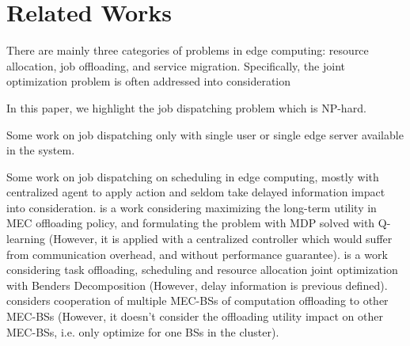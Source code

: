 \section{Related Works}
There are mainly three categories of problems in edge computing: resource allocation, job offloading, and service migration.
Specifically, the joint optimization problem is often addressed into consideration

In this paper, we highlight the job dispatching problem which is NP-hard.

Some work on job dispatching only with single user or single edge server available in the system.

Some work on job dispatching on scheduling in edge computing, mostly with centralized agent to apply action and seldom take delayed information impact into consideration.
\cite{ACCESS19-ZhengX} is a work considering maximizing the long-term utility in MEC offloading policy, and formulating the problem with MDP solved with Q-learning (However, it is applied with a centralized controller which would suffer from communication overhead, and without performance guarantee).
\cite{JSAC19-AlameddineHA} is a work considering task offloading, scheduling and resource allocation joint optimization with Benders Decomposition (However, delay information is previous defined).
\cite{Fan2017} considers cooperation of multiple MEC-BSs of computation offloading to other MEC-BSs (However, it doesn't consider the offloading utility impact on other MEC-BSs, i.e. only optimize for one BSs in the cluster).

